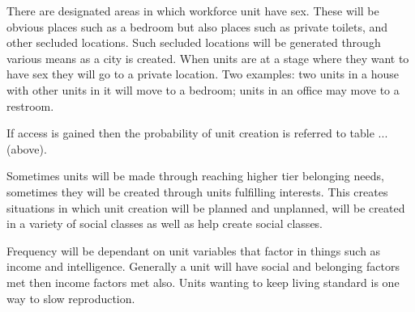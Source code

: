 There are designated areas in which workforce unit have sex. These will be obvious places such as a bedroom but also places such as private toilets, and other secluded locations. Such secluded locations will be generated through various means as a city is created. When units are at a stage where they want to have sex they will go to a private location. Two examples: two units in a house with other units in it will move to a bedroom; units in an office may move to a restroom. 

If access is gained then the probability of unit creation is referred to table ... (above).

Sometimes units will be made through reaching higher tier belonging needs, sometimes they will be created through units fulfilling interests. This creates situations in which unit creation will be planned and unplanned, will be created in a variety of social classes as well as help create social classes.

Frequency will be dependant on unit variables that factor in things such as income and intelligence.
Generally a unit will have social and belonging factors met then income factors met also. 
Units wanting to keep living standard is one way to slow reproduction.









